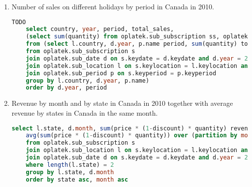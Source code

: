 \begin{enumerate}
\begin{lstlisting}[language=sql]
	 from oplatek.sub_subscription s 
	 join oplatek.sub_date d on s.keydate = d.keydate
	 join oplatek.sub_period p on s.keyperiod = p.keyperiod
	 group by d.year, p.name)
	order by year desc, period asc
  \end{lstlisting}
  \item Number of sales on different holidays by period in Canada in 2010.
  \begin{lstlisting}[language=sql] 
	TODO
	select country, year, period, total_sales, 
	(select sum(quantity) from oplatek.sub_subscription ss, oplatek.sub_date dd where ss.keydate = dd.keydate and dd.christmas = 'Y' and ss.keyperiod = p.keyperiod and ss.keylocation = l.keylocation) as christmas,
	from (select l.country, d.year, p.name period, sum(quantity) total_sales
	from oplatek.sub_subscription s 
	join oplatek.sub_date d on s.keydate = d.keydate and d.year = 2010
	join oplatek.sub_location l on s.keylocation = l.keylocation and l.country = 'Canada'
	join oplatek.sub_period p on s.keyperiod = p.keyperiod 
	group by l.country, d.year, p.name)
	order by d.year, period
  \end{lstlisting}
  \item Revenue by month and by state in Canada in 2010 together with average revenue by states in Canada in the same month.
  \begin{lstlisting}[language=sql] 
	select l.state, d.month, sum(price * (1-discount) * quantity) revenue,
	avg(sum(price * (1-discount) * quantity)) over (partition by month) avg_rev /* avg_revenue_in_this_month_across_all_states */
	from oplatek.sub_subscription s 
	join oplatek.sub_location l on s.keylocation = l.keylocation and l.country = 'Canada' 
	join oplatek.sub_date d on s.keydate = d.keydate and d.year = 2010
	where length(l.state) = 2
	group by l.state, d.month
	order by state asc, month asc
  \end{lstlisting}
\end{enumerate}

